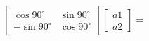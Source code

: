 \documentclass{article}
\begin{document}

$
\begin{bmatrix}
  \cos 90^{\circ} & \sin 90^{\circ}\\
  -\sin 90^{\circ} & \cos 90^{\circ}
\end{bmatrix}
\begin{bmatrix} 
  a1 \\ 
  a2 
\end{bmatrix}
=
$
\end{document}
